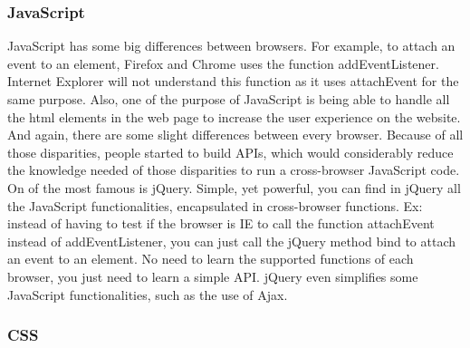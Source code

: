 \subsubsection{JavaScript}

JavaScript has some big differences between browsers. For example, to attach an event to an element, Firefox and Chrome uses the function addEventListener. Internet Explorer will not understand this function as it uses attachEvent for the same purpose. %
Also, one of the purpose of JavaScript is being able to handle all the html elements in the web page to increase the user experience on the website. And again, there are some slight differences between every browser.
Because of all those disparities, people started to build APIs, which would considerably reduce the knowledge needed of those disparities to run a cross-browser JavaScript code. On of the most famous is jQuery. Simple, yet powerful, you can find in jQuery all the JavaScript functionalities, encapsulated in cross-browser functions. Ex: instead of having to test if the browser is IE to call the function attachEvent instead of addEventListener, you can just call the jQuery method bind to attach an event to an element. No need to learn the supported functions of each browser, you just need to learn a simple API. jQuery even simplifies some JavaScript functionalities, such as the use of Ajax.

\subsubsection{CSS}

